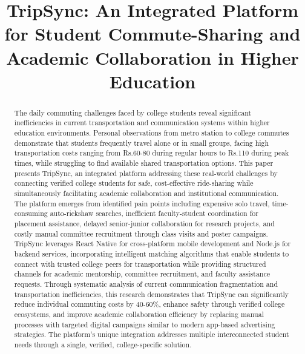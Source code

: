 \documentclass[conference]{IEEEtran}
\begin{document}
\title{TripSync: An Integrated Platform for Student Commute-Sharing and Academic Collaboration in Higher Education}

\author{
\and
{}
}

\maketitle

\begin{abstract}
The daily commuting challenges faced by college students reveal significant inefficiencies in current transportation and communication systems within higher education environments. Personal observations from metro station to college commutes demonstrate that students frequently travel alone or in small groups, facing high transportation costs ranging from Rs.60-80 during regular hours to Rs.110 during peak times, while struggling to find available shared transportation options. This paper presents TripSync, an integrated platform addressing these real-world challenges by connecting verified college students for safe, cost-effective ride-sharing while simultaneously facilitating academic collaboration and institutional communication. The platform emerges from identified pain points including expensive solo travel, time-consuming auto-rickshaw searches, inefficient faculty-student coordination for placement assistance, delayed senior-junior collaboration for research projects, and costly manual committee recruitment through class visits and poster campaigns. TripSync leverages React Native for cross-platform mobile development and Node.js for backend services, incorporating intelligent matching algorithms that enable students to connect with trusted college peers for transportation while providing structured channels for academic mentorship, committee recruitment, and faculty assistance requests. Through systematic analysis of current communication fragmentation and transportation inefficiencies, this research demonstrates that TripSync can significantly reduce individual commuting costs by 40-60\%, enhance safety through verified college ecosystems, and improve academic collaboration efficiency by replacing manual processes with targeted digital campaigns similar to modern app-based advertising strategies. The platform's unique integration addresses multiple interconnected student needs through a single, verified, college-specific solution.
\end{abstract}
\end{document}
